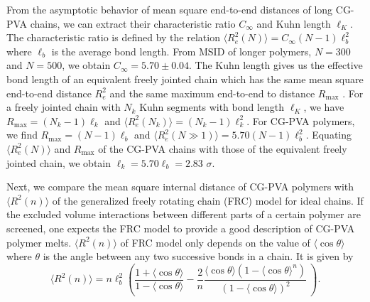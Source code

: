 \documentclass[pre,showpacs,notitlepage,twocolumn]{revtex4-1}
\begin{document}
From the asymptotic behavior of mean square end-to-end distances of long CG-PVA chains, we can extract their  characteristic ratio $C_{\infty}$ and  Kuhn  length $\ell_K$.   The characteristic ratio is
defined by the relation   $\langle R_e^2(N) \rangle= C_{\infty} (N-1) \ell_b^2$ where $\ell_b$ is the average bond length. From MSID of longer polymers, $N=300$ and $N=500$, we 
obtain $ C_{\infty} =5.70 \pm 0.04$.  The Kuhn length gives us the effective bond length of an equivalent freely jointed chain which has the same 
 mean square end-to-end distance $R_e^2$  and the same maximum end-to-end to distance $R_{\text{max}}$ \cite{Rubinstein}. For a freely jointed chain with $N_k$ Kuhn segments with  bond length $\ell_K$, we have
 $R_{\text{max}}=(N_k-1) \ell_k$ and $\langle R_e^2(N_k) \rangle=  (N_k-1)  \ell_k^2$. For  CG-PVA polymers, we find  $R_{\text{max}}=(N-1) \ell_b$ and  $\langle R_e^2(N \gg 1) \rangle= 5.70 (N-1)  \ell_b^2$. 
  Equating $\langle R_e^2(N) \rangle$ and $R_{\text{max}}$  of the CG-PVA chains with those of the equivalent  freely jointed chain, we obtain $\ell_k=5.70 \ell_b=2.83$  $\sigma$.


Next, we compare  the mean square internal distance of CG-PVA  polymers with $\langle R^2(n) \rangle$ of the generalized freely rotating chain (FRC) model \cite{Flory,FRC} for ideal chains.
If the  excluded volume interactions between different parts of a certain polymer are screened, one expects   the FRC  model to provide  a good description of CG-PVA polymer melts. 
$\langle R^2(n) \rangle$ of  FRC  model only depends on the   value of $ \langle \cos \theta \rangle$ where  $\theta$ is   the  angle between any two successive bonds in
a chain. It is given by 
%
\begin{equation}
 \langle R^2(n) \rangle=n\ell_b^2 \left( \frac{1+\langle \cos \theta \rangle}{1-\langle \cos \theta \rangle}-\frac{2}{n} \frac{\langle \cos \theta \rangle (1-\langle \cos \theta \rangle^n)}{(1-\langle \cos \theta \rangle)^2}   
 \      \right) .
 \label{eq:Boltzmann}
\end{equation}
%
\end{document}
